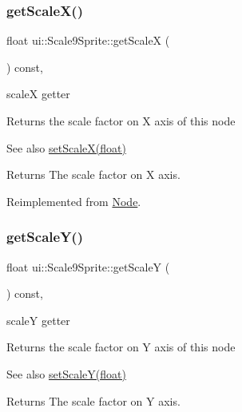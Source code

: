 \subsubsection{\texorpdfstring{get\+Scale\+X()}{getScaleX()}}
{\footnotesize\ttfamily float ui\+::\+Scale9\+Sprite\+::get\+ScaleX (\begin{DoxyParamCaption}{ }\end{DoxyParamCaption}) const\hspace{0.3cm}{\ttfamily [override]}, {\ttfamily [virtual]}}



scaleX getter 

Returns the scale factor on X axis of this node

\begin{DoxySeeAlso}{See also}
\hyperlink{classui_1_1Scale9Sprite_a7f9db0e954aca485c0d37a665927881c}{set\+Scale\+X(float)}
\end{DoxySeeAlso}
\begin{DoxyReturn}{Returns}
The scale factor on X axis. 
\end{DoxyReturn}


Reimplemented from \hyperlink{classNode_a27040ef8ab59ccf42b87d6ddc8d794e6}{Node}.

\mbox{\label{classui_1_1Scale9Sprite_a7bab472ed47f8eb5d061120915f9c2d7}} 
\subsubsection{\texorpdfstring{get\+Scale\+Y()}{getScaleY()}}
{\footnotesize\ttfamily float ui\+::\+Scale9\+Sprite\+::get\+ScaleY (\begin{DoxyParamCaption}{ }\end{DoxyParamCaption}) const\hspace{0.3cm}{\ttfamily [override]}, {\ttfamily [virtual]}}



scaleY getter 

Returns the scale factor on Y axis of this node

\begin{DoxySeeAlso}{See also}
{\ttfamily \hyperlink{classui_1_1Scale9Sprite_a7c108e20a3b0b479258447335531bfe2}{set\+Scale\+Y(float)}}
\end{DoxySeeAlso}
\begin{DoxyReturn}{Returns}
The scale factor on Y axis. 
\end{DoxyReturn}


